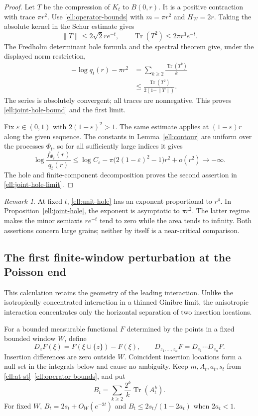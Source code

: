 \documentclass[11pt,a4paper]{article}
\theoremstyle{definition}
\theoremstyle{remark}
\newtheorem{remark}[theorem]{Remark}
\numberwithin{equation}{section}
\begin{document}
\begin{proof}
Let $T$ be the compression of $K_t$ to $B(0,r)$.
It is a positive contraction with trace $\pi r^2$.
Use \eqref{ell:operator-bounds} with $m=\pi r^2$ and
$H_W=2r$.  Taking the absolute kernel in the Schur estimate
gives
\[
 \|T\|\le2\sqrt2 r e^{-t},\qquad
 \operatorname{Tr}(T^2)\le2\pi r^3e^{-t}.
\]
The Fredholm determinant hole formula and the spectral theorem
give, under the displayed norm restriction,
\begin{align*}
 -\log q_t(r)-\pi r^2
 &=\sum_{k\ge2}\frac{\operatorname{Tr}(T^k)}k\\
 &\le\frac{\operatorname{Tr}(T^2)}{2(1-\|T\|)}.
\end{align*}
The series is absolutely convergent; all traces are nonnegative.
This proves \eqref{ell:joint-hole-bound} and the first limit.

Fix $\varepsilon\in(0,1)$ with $2(1-\varepsilon)^2>1$.
The same estimate applies at $(1-\varepsilon)r$ along the given
sequence.  The constants in Lemma~\ref{ell:contour} are uniform
over the processes $\Phi_t$, so for all sufficiently large
indices it gives
\[
 \log\frac{f_{\Phi_t}(r)}{q_t(r)}
 \le\log C_\varepsilon
    -\pi\bigl(2(1-\varepsilon)^2-1\bigr)r^2+o(r^2)
 \longrightarrow-\infty.
\]
The hole and finite-component decomposition proves the second
assertion in \eqref{ell:joint-hole-limit}.
\end{proof}

\begin{remark}\label{ell:regime-scope}
At fixed $t$, \eqref{ell:unit-hole} has an exponent proportional
to $r^4$.  In Proposition~\ref{ell:joint-hole}, the exponent is
asymptotic to $\pi r^2$.  The latter regime makes the minor
semiaxis $r e^{-t}$ tend to zero while the area tends to infinity.
Both assertions concern large grains; neither by itself is a
near-critical comparison.
\end{remark}

\subsection{The first finite-window perturbation at the Poisson end}

This calculation retains the geometry of the leading interaction.
Unlike the isotropically concentrated interaction in a thinned
Ginibre limit, the anisotropic interaction concentrates only the
horizontal separation of two insertion locations.

For a bounded measurable functional $F$ determined by the points
in a fixed bounded window $W$, define
\[
 D_zF(\xi)=F(\xi\cup\{z\})-F(\xi),\qquad
 D_{z_1,\ldots,z_n}F=D_{z_1}\cdots D_{z_n}F.
\]
Insertion differences are zero outside $W$.  Coincident insertion
locations form a null set in the integrals below and cause no
ambiguity.  Keep $m,A_t,a_t,s_t$ from
\eqref{ell:at-st}--\eqref{ell:operator-bounds}, and put
\begin{equation}\label{ell:Bt}
 B_t=\sum_{k\ge2}\frac{2^k}{k}\operatorname{Tr}(A_t^k).
\end{equation}
For fixed $W$, $B_t=2s_t+O_W(e^{-2t})$ and
$B_t\le2s_t/(1-2a_t)$ when $2a_t<1$.
\end{document}
